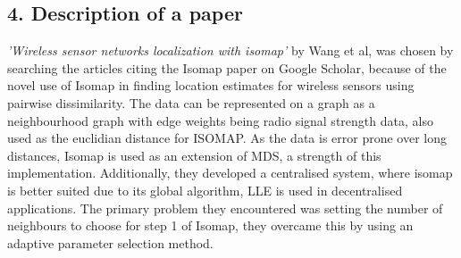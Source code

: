 \documentclass{article}
\begin{document}
\subsection{4. Description of a paper}
\textit {'Wireless sensor networks localization with isomap'} by Wang et al,\cite{wang2009wireless} was chosen by searching the articles citing the Isomap paper on Google Scholar, because of the novel use of Isomap in finding location estimates for wireless sensors using pairwise dissimilarity. The data can be represented on a graph as a neighbourhood graph with edge weights being radio signal strength data, also used as the euclidian distance for ISOMAP. As the data is error prone over long distances, Isomap is used as an extension of MDS, a strength of this implementation. Additionally, they developed a centralised system, where isomap is better suited due to its global algorithm, LLE is used in decentralised applications.\cite{patwari2004manifold} The primary problem they encountered was setting the number of neighbours to choose for step 1 of Isomap, they overcame this by using an adaptive parameter selection method.
{}

\end{document}
